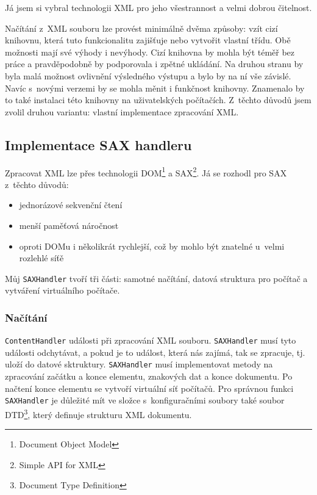 Já jsem si vybral technologii XML pro jeho všestrannost a velmi dobrou čitelnost.

Načítání z~XML souboru lze provést minimálně dvěma způsoby: vzít cizí knihovnu, která tuto funkcionalitu zajišťuje nebo vytvořit vlastní třídu. Obě možnosti mají své výhody i nevýhody. Cizí knihovna by mohla být téměř bez práce a pravděpodobně by podporovala i zpětné ukládání. Na druhou stranu by byla malá možnost ovlivnění výsledného výstupu a bylo by na ní vše závislé. Navíc s~novými verzemi by se mohla měnit i funkčnost knihovny. Znamenalo by to také instalaci této knihovny na uživatelských počítačích. Z~těchto důvodů jsem zvolil druhou variantu: vlastní implementace zpracování XML. 


\subsection{Implementace SAX handleru}
Zpracovat XML lze přes technologii DOM\footnote{Document Object Model} a SAX\footnote{Simple API for XML}. Já se rozhodl pro SAX z~těchto důvodů:
\begin{itemize}
 \item jednorázové sekvenční čtení
 \item menší paměťová náročnost
 \item oproti DOMu i několikrát rychlejší, což by mohlo být znatelné u~velmi rozlehlé síťě
\end{itemize}

Můj \verb|SAXHandler| tvoří tři části: samotné načítání, datová struktura pro počítač a vytváření virtuálního počítače.

\subsubsection{Načítání}
\verb|ContentHandler|  události při zpracování XML souboru. \verb|SAXHandler| musí tyto události odchytávat, a pokud je to událost, která nás zajímá, tak se zpracuje, tj. uloží do datové sktruktury. \verb|SAXHandler| musí implementovat metody na zpracování začátku a konce elementu, znakových dat a konce dokumentu. Po načtení konce elementu se vytvoří virtuální síť počítačů. Pro správnou funkci \verb|SAXHandler| je důležité mít ve složce s~konfiguračními soubory také soubor DTD\footnote{Document Type Definition}, který definuje strukturu XML dokumentu.

